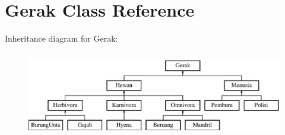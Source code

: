 \hypertarget{class_gerak}{}\section{Gerak Class Reference}
\label{class_gerak}
Inheritance diagram for Gerak\+:\begin{figure}[H]
\begin{center}
\leavevmode
\includegraphics[height=3.720930cm]{class_gerak}
\end{center}
\end{figure}
